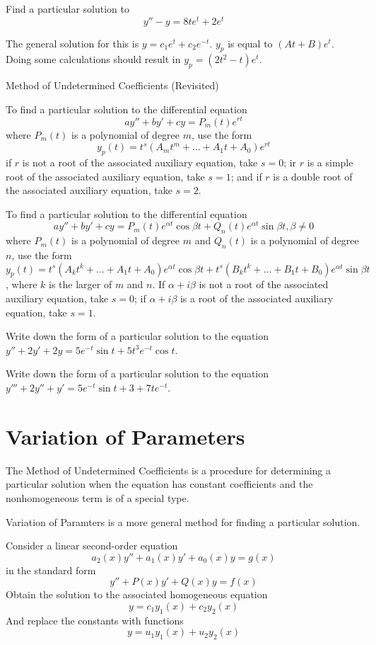 \documentclass[../diffeq.tex]{subfiles}
\begin{document}
\begin{example}
    Find a particular solution to 
    \[ y''-y=8te^t+2e^t \]

    The general solution for this is $y=c_1e^t+c_2e^{-t}$. $y_p$ is equal to $(At+B)e^t$. Doing some calculations should result in $y_p=(2t^2-t)e^t$. 
\end{example}

Method of Undetermined Coefficients (Revisited)

To find a particular solution to the differential equation 
\[ ay''+by'+cy=P_m(t)e^{rt} \]
where $P_m(t)$ is a polynomial of degree $m$, use the form 
\[ y_p(t)=t^s(A_mt^m+\dots +A_1t+A_0)e^{rt}\]
if $r$ is not a root of the associated auxiliary equation, take $s=0$; ir $r$ is a simple root of the associated 
auxiliary equation, take $s=1$; and if $r$ is a double root of the associated auxiliary equation, take $s=2$.

To find a particular solution to the differential equation 
\[ ay''+by'+cy=P_m(t)e^{\alpha t}\cos \beta t + Q_n(t)e^{\alpha t}\sin \beta t, \beta \neq 0 \]
where $P_m(t)$ is a polynomial of degree $m$ and $Q_n(t)$ is a polynomial of degree $n$, use the form 
$y_p(t)=t^s(A_kt^k+\dots+A_1t+A_0)e^{\alpha t}\cos \beta t + t^s(B_kt^k+\dots +B_1t+B_0)e^{\alpha t}\sin \beta t$, where $k$ is the larger of $m$ and $n$.
If $\alpha + i\beta$ is not a root of the associated auxiliary equation, take $s=0$; if $\alpha + i\beta$ is a root of the associated auxiliary equation, take $s=1$.

\ex Write down the form of a particular solution to the equation $y''+2y'+2y=5e^{-t}\sin t+5t^3e^{-t}\cos t$.

\ex Write down the form of a particular solution to the equation $y'''+2y''+y'=5e^{-t}\sin t+3+7te^{-t}$.

\section{Variation of Parameters}
The Method of Undetermined Coefficients is a procedure for determining a particular solution when the equation has constant coefficients and the nonhomogeneous term is of a special type.

Variation of Paramters is a more general method for finding a particular solution.

Consider a linear second-order equation 
\[ a_2(x)y'' + a_1(x)y'+a_0(x)y=g(x) \]
in the standard form 
\[ y''+P(x)y'+Q(x)y=f(x) \]
Obtain the solution to the associated homogeneous equation 
\[ y=c_1y_1(x)+c_2y_2(x)\]
And replace the constants with functions 
\[ y=u_1y_1(x)+u_2y_2(x)\]
\end{document}
